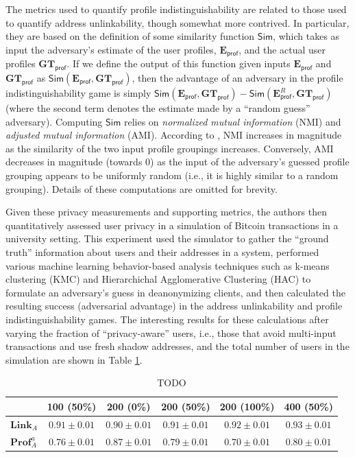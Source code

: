 The metrics used to quantify profile indistinguishability are related to those used to quantify address unlinkability, though somewhat more contrived. In particular, they are based on the definition of some similarity function $\mathsf{Sim}$, which takes as input the adversary's estimate of the user profiles, $\mathbf{E}_\mathsf{prof}$, and the actual user profiles $\mathbf{GT}_\mathsf{prof}$. If we define the output of this function given inputs $\mathbf{E}_\mathsf{prof}$ and $\mathbf{GT}_\mathsf{prof}$ as $\mathsf{Sim}(\mathbf{E}_\mathsf{prof}, \mathbf{GT}_\mathsf{prof})$, then the advantage of an adversary in the profile indistinguishability game is simply $\mathsf{Sim}(\mathbf{E}_\mathsf{prof}, \mathbf{GT}_\mathsf{prof}) - \mathsf{Sim}(\mathbf{E}_\mathsf{prof}^R, \mathbf{GT}_\mathsf{prof})$ (where the second term denotes the estimate made by a ``random guess'' adversary). Computing $\mathsf{Sim}$ relies on \emph{normalized mutual information} (NMI) and \emph{adjusted mutual information} (AMI). According to \cite{privacy-19,privacy-20}, NMI increases in magnitude as the similarity of the two input profile groupings increases. Conversely, AMI decreases in magnitude (towards 0) as the input of the adversary's guessed profile grouping appears to be uniformly random (i.e., it is highly similar to a random grouping). Details of these computations are omitted for brevity. 

Given these privacy measurements and supporting metrics, the authors then quantitatively assessed user privacy in a simulation of Bitcoin transactions in a university setting. This experiment used the simulator to gather the ``ground truth'' information about users and their addresses in a system, performed various machine learning behavior-based analysis techniques such as k-means clustering (KMC) and Hierarchichal Agglomerative Clustering (HAC) to formulate an adversary's guess in deanonymizing clients, and then calculated the resulting success (adversarial advantage) in the address unlinkability and profile indistinguishability games. The interesting results for these calculations after varying the fraction of ``privacy-aware'' users, i.e., those that avoid multi-input transactions and use fresh shadow addresses, and the total number of users in the simulation are shown in Table \ref{tab:eval-privacy-results}.

\begin{table}
\begin{center}
\caption{TODO}
\label{tab:eval-privacy-results}
    \begin{tabular}{|l||ccccc|}\hline
    ~                   & 100 (50\%) & 200 (0\%) & 200 (50\%) & 200 (100\%) & 400 (50\%) \\ \hline
    $\mathbf{Link}_A$   & $0.91 \pm 0.01$ & $0.90 \pm 0.01$ & $0.91 \pm 0.01$ & $0.92 \pm 0.01$ & $0.93 \pm 0.01$ \\
    $\mathbf{Prof}_A^a$ & $0.76 \pm 0.01$ & $0.87 \pm 0.01$ & $0.79 \pm 0.01$ & $0.70 \pm 0.01$ & $0.80 \pm 0.01$ \\ \hline
    \end{tabular}
\end{center}
\end{table}


